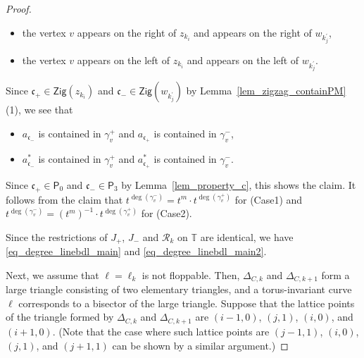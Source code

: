 \documentclass[10pt,a4paper]{amsart}
\numberwithin{equation}{section}
\theoremstyle{definition}
\newcommand{\TT}{\mathbb{T}}
\newcommand{\calR}{\mathcal{R}}
\newcommand{\fkc}{\mathfrak{c}}
\newcommand{\sfP}{\mathsf{P}}
\newcommand{\Zig}{\mathsf{Zig}}
\begin{document}
\begin{proof}
\begin{itemize}
\begin{itemize}\setlength{\leftskip}{1cm}\itemsep=0pt
\item[(Case 1)] the vertex $v$ appears on the right of $z_{k_i}$ and appears on the right of $w_{k_j^\prime}$,
\item[(Case 2)] the vertex $v$ appears on the left of $z_{k_i}$ and appears on the left of $w_{k_j^\prime}$.
\end{itemize}
Since $\fkc_+\in\Zig(z_{k_i})$ and $\fkc_-\in\Zig(w_{k^\prime_j})$ by Lemma~\ref{lem_zigzag_containPM}(1),
we see that
\begin{itemize}\setlength{\leftskip}{1cm}\itemsep=0pt
\item[(Case 1)] $a_{\fkc_-}$ is contained in $\gamma_v^+$ and $a_{\fkc_+}$ is contained in $\gamma_v^-$,
\item[(Case 2)] $a_{\fkc_-}^*$ is contained in $\gamma_v^+$ and $a_{\fkc_+}^*$ is contained in $\gamma_v^-$.
\end{itemize}
Since $\fkc_+\in\sfP_0$ and $\fkc_-\in\sfP_3$ by Lemma~\ref{lem_property_c}, this shows the claim.
It follows from the claim that
$t^{\deg(\gamma^-_v)}=t^m\cdot t^{\deg(\gamma^+_v)}$ for (Case1) and $t^{\deg(\gamma^-_v)}=(t^m)^{-1}\cdot t^{\deg(\gamma^+_v)}$ for (Case2).
\end{itemize}
Since the restrictions of $J_+$, $J_-$ and $\calR_k$ on $\TT$ are identical,
we have \eqref{eq_degree_linebdl_main} and \eqref{eq_degree_linebdl_main2}.

Next, we assume that $\ell=\ell_k$ is not floppable.
Then, $\Delta_{C,k}$ and $\Delta_{C,k+1}$ form a large triangle consisting of two elementary triangles,
and a torus-invariant curve $\ell$ corresponds to a bisector of the large triangle.
Suppose that the lattice points of the triangle formed by $\Delta_{C,k}$ and $\Delta_{C,k+1}$ are $(i-1,0)$, $(j,1)$, $(i,0)$, and $(i+1,0)$.
(Note that the case where such lattice points are $(j-1,1)$, $(i,0)$, $(j,1)$, and $(j+1,1)$ can be shown by a similar argument.)


\end{proof}
\end{document}
